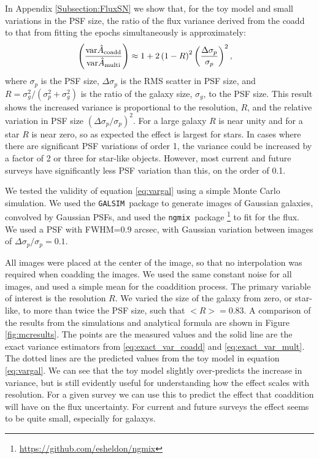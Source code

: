 \documentclass[fleqn,useAMS,usenatbib]{mnras}
\newcommand{\galsim}{\texttt{GALSIM}}
\newcommand{\ngmix}{\texttt{ngmix}}
\newcommand{\coadd}{{\rm coadd}}
\begin{document}
In Appendix \ref{Subsection:FluxSN} we show that, for the toy model and small
variations in the PSF size, the ratio of the flux variance derived from the
coadd to that from fitting the epochs simultaneously is approximately:
\begin{align} \label{eq:vargal}
\left( \frac{ {\rm var} \hat{A}_\coadd}{{\rm var} \hat{A}_{\rm multi} } 
\right) &
\approx 1 + 2 \left( 1 - R \right)^2 \left( \frac{\Delta 
\sigma_p}{\sigma_p} \right)^2,
\end{align}
where $\sigma_p$ is the PSF size, $\Delta \sigma_p$ is the RMS scatter in PSF
size, and $R=\sigma_g^2/(\sigma_p^2 + \sigma_g^2)$ is the ratio of the galaxy
size, $\sigma_g$, to the PSF size.  This result shows the increased variance is
proportional to the resolution, $R$, and the relative variation in PSF size
$(\Delta \sigma_p/\sigma_p)^2$.  For a large galaxy $R$ is near unity and for a star
$R$ is near zero, so as expected the effect is largest for stars.  In cases where there
are significant PSF variations of order 1, the variance could be increased by a
factor of 2 or three for star-like objects.  However, most current and future
surveys have significantly less PSF variation than this, on the order of 0.1.

We tested the validity of equation \ref{eq:vargal} using a simple Monte Carlo
simulation.  We used the \galsim\ package to generate images of Gaussian
galaxies, convolved by Gaussian PSFs, and used the \ngmix\ package
\footnote{\url{https://github.com/esheldon/ngmix}} to fit for the flux. We used
a PSF with FWHM=0.9 arcsec, with Gaussian variation between images of $\Delta
\sigma_p/\sigma_p = 0.1$.

All images were placed at the center of the image, so that no interpolation was 
required when coadding the images.  We used the same constant noise for all 
images, and used a simple mean for the coaddition process.  The primary 
variable of interest is the resolution $R$.  We varied the size of the galaxy 
from zero, or star-like, to more than twice the PSF size, such that $<R> = 
0.83$.  A comparison of the results from the simulations and analytical formula 
are shown in Figure \ref{fig:mcresults}.  The points are the measured values 
and the solid line are the exact variance estimators from 
\ref{eq:exact_var_coadd} and \ref{eq:exact_var_mult}.  The dotted lines are the 
predicted values from the toy model in equation \ref{eq:vargal}.  We can 
see that the toy model slightly over-predicts the increase in variance, but is 
still evidently useful for understanding how the effect scales with resolution. 
For a given survey we can use this to predict the effect that coaddition will 
have on the flux uncertainty.  For current and future surveys the effect seems 
to be quite small, especially for galaxys.
\end{document}
